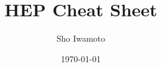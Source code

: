 \documentclass[a4paper,10pt,captions=tableheading,DIV=14]{scrartcl}
\title{HEP Cheat Sheet}
\date{\today}
\author{Sho Iwamoto}
\numberwithin{equation}{section}
\begin{document}
\nocite{PDG2018,PDG2020}


\clearpage

\clearpage

\clearpage

\clearpage

\clearpage

\clearpage

\clearpage

\clearpage

\clearpage

\clearpage
\appendix

\end{document}
